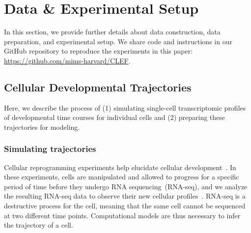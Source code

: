 
\section{Data \& Experimental Setup}

In this section, we provide further details about data construction, data preparation, and experimental setup. We share code and instructions in our GitHub repository to reproduce the experiments in this paper: \url{https://github.com/mims-harvard/CLEF}.

\subsection{Cellular Developmental Trajectories}\label{appendix:cells}

Here, we describe the process of (1) simulating single-cell transcriptomic profiles of developmental time courses for individual cells and (2) preparing these trajectories for modeling.

\subsubsection{Simulating trajectories}

Cellular reprogramming experiments help elucidate cellular development~\cite{schiebinger2019-ie}. In these experiments, cells are manipulated and allowed to progress for a specific period of time before they undergo RNA sequencing~(RNA-seq), and we analyze the resulting RNA-seq data to observe their new cellular profiles~\cite{schiebinger2019-ie}. RNA-seq is a destructive process for the cell, meaning that the same cell cannot be sequenced at two different time points. Computational models are thus necessary to infer the trajectory of a cell.


